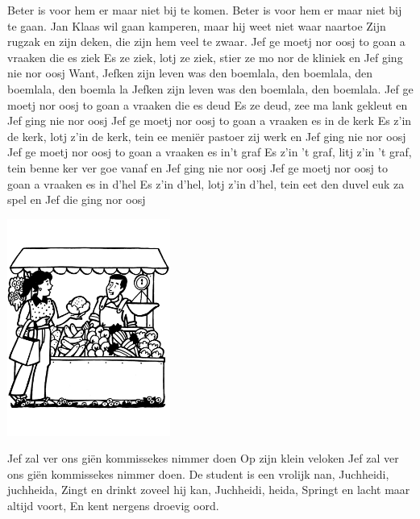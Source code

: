 \documentclass{article}
\begin{document}
\begin{songs}{}
Beter is voor hem 
er maar niet bij te komen.
Beter is voor hem 
er maar niet bij te gaan.
\endchorus
\beginverse
Jan Klaas wil gaan kamperen,
maar hij weet niet waar naartoe
Zijn rugzak en zijn deken,
die zijn hem veel te zwaar.
\endverse
\endsong
{}
\beginverse
Jef ge moetj nor oosj to goan a vraaken die es ziek 
Es ze ziek, lotj ze ziek, stier ze mo nor de kliniek
en Jef ging nie nor oosj 
\endverse
\beginchorus
Want, Jefken zijn leven was den boemlala, den boemlala, den boemlala, den boemla la
Jefken zijn leven was den boemlala, den boemlala. 
\endchorus
\beginverse
Jef ge moetj nor oosj to goan a vraaken die es deud	
Es ze deud, zee ma lank gekleut
en Jef ging nie nor oosj	
\endverse
\beginverse
Jef ge moetj nor oosj to goan a vraaken es in de kerk	
Es z’in de kerk, lotj z’in de kerk, tein ee meniër pastoer zij werk
en Jef ging nie nor oosj 
\endverse
\beginverse
Jef ge moetj nor oosj to goan a vraaken es in’t graf 
Es z’in 't graf, litj z’in 't graf, tein benne ker ver goe vanaf
en Jef ging nie nor oosj 
\endverse
\beginverse
Jef ge moetj nor oosj to goan a vraaken es in d’hel	
Es z’in d’hel, lotj z’in d’hel, tein eet den duvel euk za spel
en Jef die ging nor oosj 
\endverse
\endsong
\begin{intersong}
    \includegraphics[width=0.4\textwidth]{jefzalveroonsgienkommissekesnimmerdoen}
\end{intersong}
\beginverse*
Jef zal ver ons giën kommissekes nimmer doen 
Op zijn klein veloken 
Jef zal ver ons giën kommissekes nimmer doen. 
\endverse
\endsong
{}
\beginverse
De student is een vrolijk nan,
Juchheidi, juchheida,
Zingt en drinkt zoveel hij kan,
Juchheidi, heida,
Springt en lacht maar altijd voort,
En kent nergens droevig oord.

\end{songs}
\end{document}
